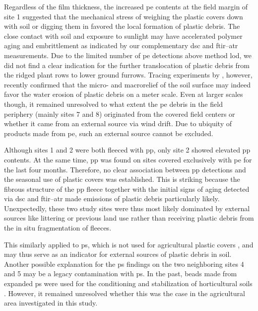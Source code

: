 Regardless of the film thickness, the increased \ac{pe} contents at the field margin of site 1 suggested that the mechanical stress of weighing the plastic covers down with soil or digging them in favored the local formation of plastic debris. The close contact with soil and exposure to sunlight may have accelerated polymer aging and embrittlement as indicated by our complementary \ac{dsc} and \ac{ftir}--\ac{atr} measurements.
Due to the limited number of \ac{pe} detections above method \ac{lod}, we did not find a clear indication for the further translocation of plastic debris from the ridged plant rows to lower ground furrows. Tracing experiments by \citet{LaermannsTracing2021}, however, recently confirmed that the micro- and macrorelief of the soil surface may indeed favor the water erosion of plastic debris on a meter scale.
Even at larger scales though, it remained unresolved to what extent the \ac{pe} debris in the field periphery (mainly sites 7 and 8) originated from the covered field centers or whether it came from an external source via wind drift. Due to ubiquity of products made from \ac{pe}, such an external source cannot be excluded.

Although sites 1 and 2 were both fleeced with \ac{pp}, only site 2 showed elevated \ac{pp} contents. At the same time, \ac{pp} was found on sites covered exclusively with \ac{pe} for the last four months. Therefore, no clear association between \ac{pp} detections and the seasonal use of plastic covers was established. This is striking because the fibrous structure of the \ac{pp} fleece together with the initial signs of aging detected via \ac{dsc} and \ac{ftir}--\ac{atr} made emissions of plastic debris particularly likely.
Unexpectedly, these two study sites were thus most likely dominated by external sources like littering or previous land use rather than receiving plastic debris from the in situ fragmentation of fleeces.

This similarly applied to \ac{ps}, which is not used for agricultural plastic covers \citep{BertlingKunststoffe2021}, and may thus serve as an indicator for external sources of plastic debris in soil. Another possible explanation for the \ac{ps} findings on the two neighboring sites 4 and 5 may be a legacy contamination with \ac{ps}. In the past, beads made from expanded \ac{ps} were used for the conditioning and stabilization of horticultural soils \citep{MaghchicheUse2010}. However, it remained unresolved whether this was the case in the agricultural area investigated in this study.

